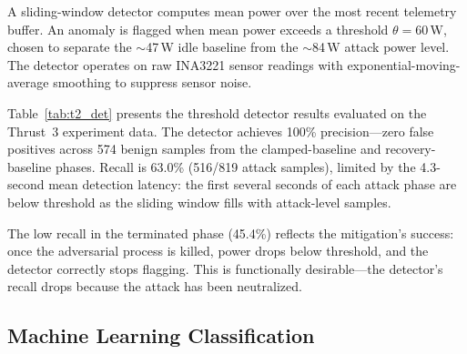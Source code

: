 \documentclass[letterpaper,twocolumn,10pt]{article}
\begin{document}
A sliding-window detector computes mean power over the most recent
telemetry buffer.  An anomaly is flagged when mean power exceeds
a threshold $\theta = 60$\,W, chosen to separate the $\sim$47\,W
idle baseline from the $\sim$84\,W attack power level.  The
detector operates on raw INA3221 sensor readings with
exponential-moving-average smoothing to suppress sensor noise.

Table~\ref{tab:t2_det} presents the threshold detector results
evaluated on the Thrust~3 experiment data.  The detector achieves
100\% precision---zero false positives across 574 benign samples
from the clamped-baseline and recovery-baseline phases.  Recall is
63.0\% (516/819 attack samples), limited by the 4.3-second mean
detection latency: the first several seconds of each attack phase
are below threshold as the sliding window fills with attack-level
samples.

\begin{table}[t]
\centering
\caption{Threshold detector performance ($\theta = 60$\,W),
  evaluated on Thrust~3 closed-loop data (5 trials).}
\label{tab:t2_det}
\end{table}

The low recall in the terminated phase (45.4\%) reflects the
mitigation's success: once the adversarial process is killed, power
drops below threshold, and the detector correctly stops flagging.
This is functionally desirable---the detector's recall drops because
the attack has been neutralized.

\subsection{Machine Learning Classification}
\label{sec:detect-ml}
\end{document}
